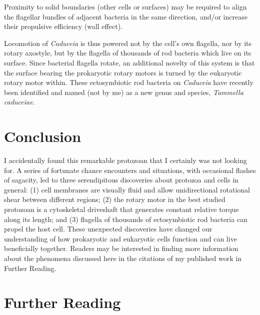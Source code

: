 \documentclass[authordate, anecdote]{jote-new-article}
\begin{document}
	Proximity to solid boundaries (other cells or surfaces) may be required to align the flagellar bundles of adjacent bacteria in the same direction, and/or increase their propulsive efficiency (wall effect).







	Locomotion of \emph{Caduceia} is thus powered not by the cell's own flagella, nor by its rotary axostyle, but by the flagella of thousands of rod bacteria which live on its surface. Since bacterial flagella rotate, an additional novelty of this system is that the surface bearing the prokaryotic rotary motors is turned by the eukaryotic rotary motor within. These ectosymbiotic rod bacteria on \emph{Caduceia} have recently been identified and named (not by me) as a new genus and species, \emph{Tammella}\emph{ }\emph{caduceiae}\emph{. }







	\section{Conclusion}







	I accidentally found this remarkable protozoan that I certainly was not looking for. A series of fortunate chance encounters and situations, with occasional flashes of sagacity, led to three serendipitous discoveries about protozoa and cells in general: (1) cell membranes are visually fluid and allow unidirectional rotational shear between different regions; (2) the rotary motor in the best studied protozoan is a cytoskeletal driveshaft that generates constant relative torque along its length; and (3) flagella of thousands of ectosymbiotic rod bacteria can propel the host cell. These unexpected discoveries have changed our understanding of how prokaryotic and eukaryotic cells function and can live beneficially together. Readers may be interested in finding more information about the phenomena discussed here in the citations of my published work in Further Reading.











	\section{Further Reading}
\end{document}
